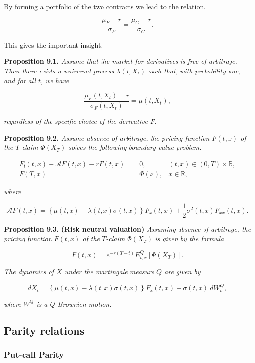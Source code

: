 \documentclass[
]{article}
\begin{document}
By forming a portfolio of the two contracts we lead to the relation.

\[
\frac{\mu_F-r}{\sigma_F}=\frac{\mu_G-r}{\sigma_G}.
\]

This gives the important insight.

\textbf{Proposition 9.1.} \emph{Assume that the market for derivatives
is free of arbitrage. Then there exists a universal process
\(\lambda(t,X_t)\) such that, with probability one, and for all \(t\),
we have}

\[
\frac{\mu_F(t,X_t)-r}{\sigma_F(t,X_t)}=\mu(t,X_t),\tag{9.7}
\]

\emph{regardless of the specific choice of the derivative \(F\).}

\textbf{Proposition 9.2.} \emph{Assume absence of arbitrage, the pricing
function \(F(t,x)\) of the \(T\)-claim \(\Phi(X_T)\) solves the
following boundary value problem.}

\begin{align*}
F_t(t,x)+\mathcal{A}F(t,x)-rF(t,x)&=0,\hspace{15pt}&(t,x)\in (0,T)\times \mathbb{R},\tag{9.8}\\
F(T,x)&=\Phi(x), &x\in\mathbb{R},\tag{9.9}
\end{align*}

\emph{where}

\[
\mathcal{A}F(t,x)=\left\{\mu(t,x)-\lambda(t,x)\sigma(t,x)\right\}F_x(t,x)+\frac{1}{2}\sigma^2(t,x)F_{xx}(t,x).
\]

\textbf{Proposition 9.3.} \textbf{(Risk neutral valuation)}
\emph{Assuming absence of arbitrage, the pricing function \(F(t,x)\) of
the \(T\)-claim \(\Phi(X_T)\) is given by the formula}

\[
F(t,x)=e^{-r(T-t)}E^Q_{t,x}[\Phi(X_T)].\tag{9.11}
\]

\emph{The dynamics of \(X\) under the martingale measure \(Q\) are given
by}

\[
dX_t=\left\{\mu(t,x)-\lambda(t,x)\sigma(t,x)\right\}F_x(t,x)+\sigma(t,x)\ dW^Q_t,
\]

\emph{where \(W^Q\) is a \(Q\)-Brownien motion.}

\hypertarget{parity-relations}{%
\subsection{Parity relations}\label{parity-relations}}

\hypertarget{put-call-parity}{%
\subsubsection{Put-call Parity}\label{put-call-parity}}
\end{document}
